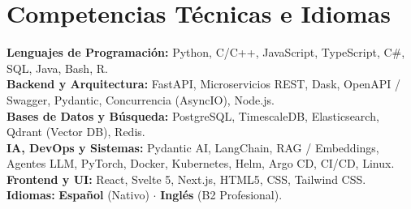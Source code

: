\documentclass[a4paper,10pt]{article}
\begin{document}
\section*{Competencias Técnicas e Idiomas}

{\footnotesize
\noindent\textbf{Lenguajes de Programación:} Python, C/C++, JavaScript, TypeScript, C\#, SQL, Java, Bash, R. \\[2.5pt]
\textbf{Backend y Arquitectura:} FastAPI, Microservicios REST, Dask, OpenAPI / Swagger, Pydantic, Concurrencia (AsyncIO), Node.js. \\[2.5pt]
\textbf{Bases de Datos y Búsqueda:} PostgreSQL, TimescaleDB, Elasticsearch, Qdrant (Vector DB), Redis. \\[2.5pt]
\textbf{IA, DevOps y Sistemas:} Pydantic AI, LangChain, RAG / Embeddings, Agentes LLM, PyTorch, Docker, Kubernetes, Helm, Argo CD, CI/CD, Linux. \\[2.5pt]
\textbf{Frontend y UI:} React, Svelte 5, Next.js, HTML5, CSS, Tailwind CSS. \hfill \textbf{Idiomas:} \textbf{Español} (Nativo) \enskip $\cdot$ \enskip \textbf{Inglés} (B2 Profesional).
}
\end{document}
